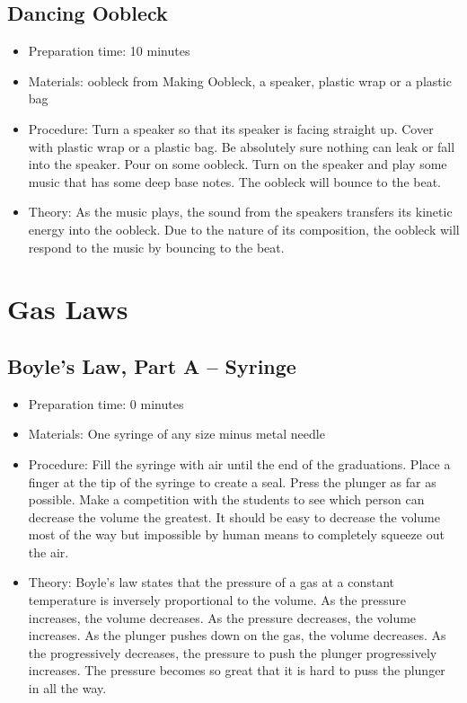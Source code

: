 \subsection{Dancing Oobleck}
\begin{itemize}
\item{Preparation time: 10 minutes}
\item{Materials: oobleck from Making Oobleck, a speaker, plastic wrap or a plastic bag}
\item{Procedure: Turn a speaker so that its speaker is facing straight up. Cover with plastic wrap or a plastic bag. Be absolutely sure nothing can leak or fall into the speaker. Pour on some oobleck. Turn on the speaker and play some music that has some deep base notes. The oobleck will bounce to the beat.}
\item{Theory: As the music plays, the sound from the speakers transfers its kinetic energy into the oobleck. Due to the nature of its composition, the oobleck will respond to the music by bouncing to the beat.}
\end{itemize}

\section{Gas Laws}

\subsection{Boyle’s Law, Part A – Syringe}
\begin{itemize}
\item{Preparation time: 0 minutes}
\item{Materials: One syringe of any size minus metal needle}
\item{Procedure: Fill the syringe with air until the end of the graduations. Place a finger at the tip of the syringe to create a seal. Press the plunger as far as possible. Make a competition with the students to see which person can decrease the volume the greatest. It should be easy to decrease the volume most of the way but impossible by human means to completely squeeze out the air.}
\item{Theory: Boyle’s law states that the pressure of a gas at a constant temperature is inversely proportional to the volume. As the pressure increases, the volume decreases. As the pressure decreases, the volume increases. As the plunger pushes down on the gas, the volume decreases. As the progressively decreases, the pressure to push the plunger progressively increases. The pressure becomes so great that it is hard to puss the plunger in all the way. }
\end{itemize}

